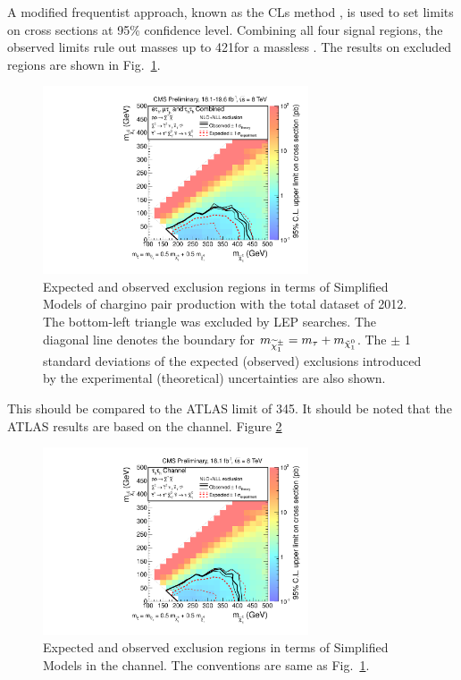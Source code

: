 A modified frequentist approach, known as the CLs method \cite{read:CLs}, is used to 
set limits on cross sections at 95\% confidence level.
Combining all four signal regions,
the observed limits rule out \chione  masses up to  421\GeV  for a massless \PSGczDo.  
The results on excluded regions are shown in Fig.~\ref{fig:limit_final}. 
\begin{linenomath}
\begin{figure}[!htb]
\centering
\includegraphics[width=0.7\textwidth,keepaspectratio=true]{StatisticsFig/Exclusion4Bins.pdf}
\caption{Expected and observed exclusion regions in terms of Simplified Models of
chargino pair production 
with the total dataset of 2012. The bottom-left triangle was excluded by LEP \sTau searches. 
The diagonal line denotes the boundary for $m_{\widetilde{\chi}^{\pm}_1} = m_{\tau} + m_{\tilde{\chi}^{0}_1}$.
The $\pm$ 1 standard deviations of the expected (observed) exclusions introduced by the experimental 
(theoretical) uncertainties are also shown.}
\label{fig:limit_final}
\end{figure}
\end{linenomath}
This should be compared to the ATLAS limit of 345\GeV \cite{Aad:2014yka}.
It should be noted that the ATLAS results are based on the \tauTau channel. Figure 
\ref{fig:limit_tauTau} 
\begin{linenomath}
\begin{figure}[!htb]
\centering
\includegraphics[width=0.7\textwidth,keepaspectratio=true]{StatisticsFig/ExclusionTauTau2Bin.pdf}
\caption{Expected and observed exclusion regions in terms of Simplified Models
in the \tauTau channel. The conventions are same as Fig.~\ref{fig:limit_final}.}
\label{fig:limit_tauTau}
\end{figure}
\end{linenomath}
